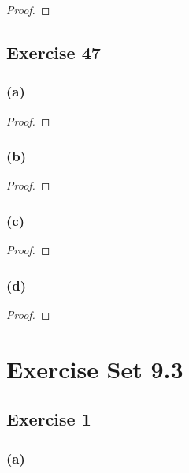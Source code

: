 \documentclass[14pt]{extarticle}
\begin{document}
\begin{proof}

\end{proof}

\subsection{Exercise 47}

\subsubsection{(a)}

\begin{proof}

\end{proof}

\subsubsection{(b)}

\begin{proof}

\end{proof}

\subsubsection{(c)}

\begin{proof}

\end{proof}

\subsubsection{(d)}

\begin{proof}

\end{proof}

\section{Exercise Set 9.3}

\subsection{Exercise 1}

\subsubsection{(a)}
\end{document}
